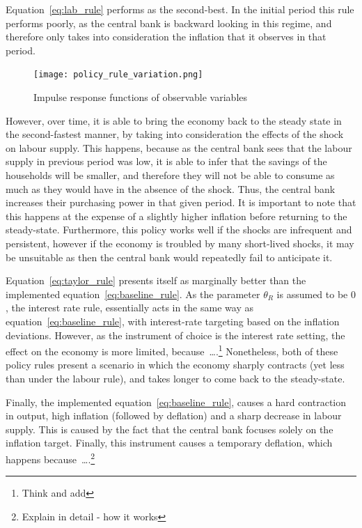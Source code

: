 \documentclass[12pt]{article}
\begin{document}
Equation~\ref{eq:lab_rule} performs as the second-best. In the initial period this rule performs poorly, as the central bank is backward looking in this regime, and therefore only takes into consideration the inflation that it observes in that period.  

\begin{figure}[!h]
    \caption{Impulse response functions of observable variables}\label{fig:policy_rule_variation}
    \centering
    \texttt{[image: policy\_rule\_variation.png]}
\end{figure}

However, over time, it is able to bring the economy back to the steady state in the second-fastest manner, by taking into consideration the effects of the shock on labour supply. This happens, because as the central bank sees that the labour supply in previous period was low, it is able to infer that the savings of the households will be smaller, and therefore they will not be able to consume as much as they would have in the absence of the shock. Thus, the central bank increases their purchasing power in that given period. It is important to note that this happens at the expense of a slightly higher inflation before returning to the steady-state. Furthermore, this policy works well if the shocks are infrequent and persistent, however if the economy is troubled by many short-lived shocks, it may be unsuitable as then the central bank would repeatedly fail to anticipate it.

Equation~\ref{eq:taylor_rule} presents itself as marginally better than the implemented equation~\ref{eq:baseline_rule}. As the parameter $\theta_R$ is assumed to be $0$, the interest rate rule, essentially acts in the same way as equation~\ref{eq:baseline_rule}, with interest-rate targeting based on the inflation deviations. However, as the instrument of choice is the interest rate setting, the effect on the economy is more limited, because\ \dots.\footnote{Think and add} Nonetheless, both of these policy rules present a scenario in which the economy sharply contracts (yet less than under the labour rule), and takes longer to come back to the steady-state. 

Finally, the implemented equation~\ref{eq:baseline_rule}, causes a hard contraction in output, high inflation (followed by deflation) and a sharp decrease in labour supply. This is caused by the fact that the central bank focuses solely on the inflation target. Finally, this instrument causes a temporary deflation, which happens because\ \dots.\footnote{Explain in detail - how it works}
\end{document}
